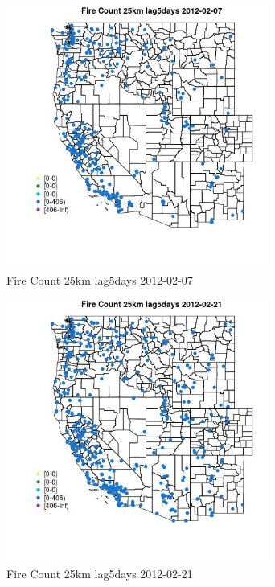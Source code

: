 \begin{figure} 
\centering  
\includegraphics[width=0.77\textwidth]{Code_Outputs/Report_ML_input_PM25_Step4_part_f_de_duplicated_aveswNAs_MapObsFire_Count_25km_lag5days2012-02-07.jpg} 
\caption{\label{fig:Report_ML_input_PM25_Step4_part_f_de_duplicated_aveswNAsMapObsFire_Count_25km_lag5days2012-02-07}Fire Count 25km lag5days 2012-02-07} 
\end{figure} 
 

\begin{figure} 
\centering  
\includegraphics[width=0.77\textwidth]{Code_Outputs/Report_ML_input_PM25_Step4_part_f_de_duplicated_aveswNAs_MapObsFire_Count_25km_lag5days2012-02-21.jpg} 
\caption{\label{fig:Report_ML_input_PM25_Step4_part_f_de_duplicated_aveswNAsMapObsFire_Count_25km_lag5days2012-02-21}Fire Count 25km lag5days 2012-02-21} 
\end{figure} 
 

